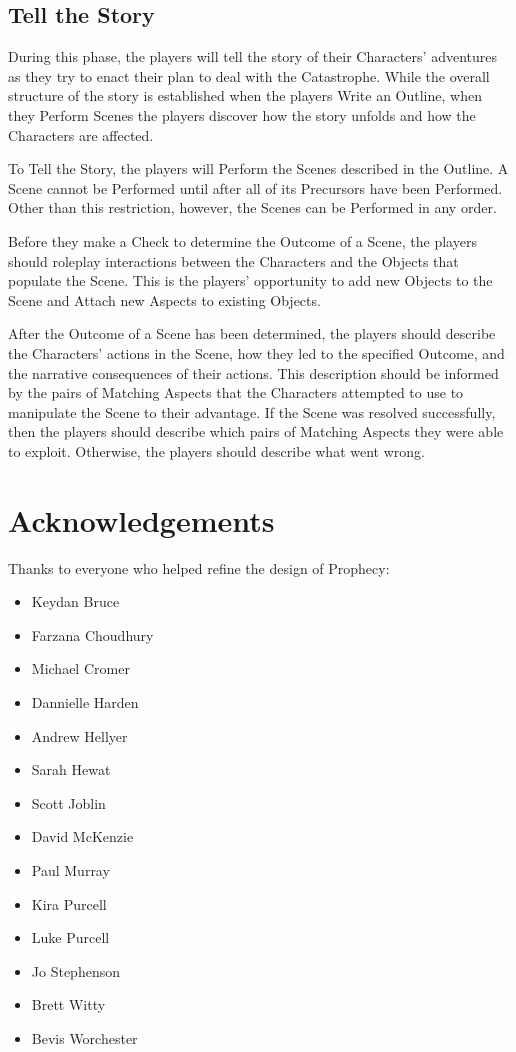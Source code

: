 \documentclass[12pt, a5paper, parskip=half-]{scrartcl}
\begin{document}
\newpage

\subsection*{Tell the Story}
During this phase, the players will tell the story of their Characters' adventures as they try to enact their plan to deal with the Catastrophe.
While the overall structure of the story is established when the players Write an Outline, when they Perform Scenes the players discover how the story unfolds and how the Characters are affected.

To Tell the Story, the players will Perform the Scenes described in the Outline.
A Scene cannot be Performed until after all of its Precursors have been Performed. Other than this restriction, however, the Scenes can be Performed in any order.

Before they make a Check to determine the Outcome of a Scene, the players should roleplay interactions between the Characters and the Objects that populate the Scene.
This is the players' opportunity to add new Objects to the Scene and Attach new Aspects to existing Objects.

After the Outcome of a Scene has been determined, the players should describe the Characters' actions in the Scene, how they led to the specified Outcome, and the narrative consequences of their actions.
This description should be informed by the pairs of Matching Aspects that the Characters attempted to use to manipulate the Scene to their advantage.
If the Scene was resolved successfully, then the players should describe which pairs of Matching Aspects they were able to exploit.
Otherwise, the players should describe what went wrong.

\newpage

\section*{Acknowledgements}
Thanks to everyone who helped refine the design of Prophecy:
\begin{itemize}
  \item Keydan Bruce
  \item Farzana Choudhury
  \item Michael Cromer
  \item Dannielle Harden
  \item Andrew Hellyer
  \item Sarah Hewat
  \item Scott Joblin
  \item David McKenzie
  \item Paul Murray
  \item Kira Purcell
  \item Luke Purcell
  \item Jo Stephenson
  \item Brett Witty
  \item Bevis Worchester
\end{itemize}
\end{document}
